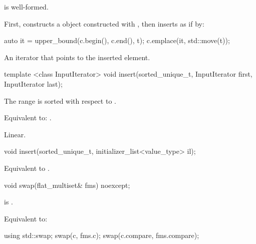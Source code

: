 \begin{codeblock}
\begin{codeblock}
\begin{codeblock}
\begin{addedblock}
\begin{itemdescr}
\pnum \constraints {} is well-formed.

\pnum
\effects
First, constructs a  object  constructed
with , then inserts  as if by:
\begin{codeblock}
auto it = upper_bound(c.begin(), c.end(), t);
c.emplace(it, std::move(t));
\end{codeblock}

\pnum
\returns
An iterator that points to the inserted element.
\end{itemdescr}

%
\begin{itemdecl}
template <class InputIterator>
  void insert(sorted_unique_t, InputIterator first, InputIterator last);
\end{itemdecl}

\begin{itemdescr}
\pnum \expects
The range  is sorted with respect to .

\pnum \effects Equivalent to: .

\pnum \complexity Linear.
\end{itemdescr}

%
\begin{itemdecl}
void insert(sorted_unique_t, initializer_list<value_type> il);
\end{itemdecl}

\begin{itemdescr}
\pnum \effects Equivalent to .
\end{itemdescr}

%
\begin{itemdecl}
void swap(flat_multiset& fms) noexcept;
\end{itemdecl}

\begin{itemdescr}
\pnum \constraints {} is .

\pnum \effects Equivalent to:
\begin{codeblock}
using std::swap;
swap(c, fms.c);
swap(c.compare, fms.compare);
\end{codeblock}
\end{itemdescr}


\end{addedblock}
\end{codeblock}
\end{codeblock}
\end{codeblock}
